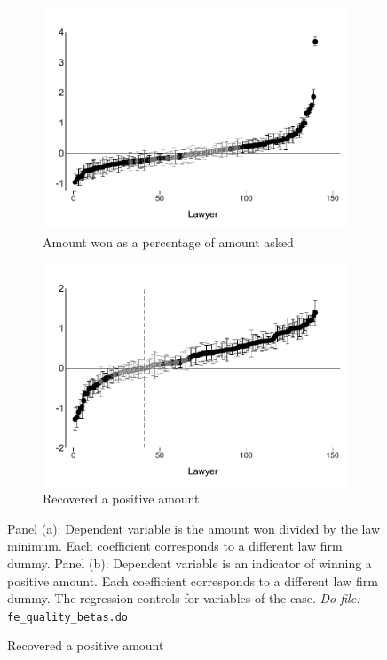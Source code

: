 \documentclass[oneside,12pt]{article}
\begin{document}
\begin{figure}[!htbp] %
    \caption{Lawyer fixed effects, controlling for variables of the case}
     \begin{center}
    \begin{subfigure}{0.49\textwidth}
        \caption{Amount won as a percentage of amount asked}
        \centering
        \includegraphics[width=\textwidth]{Figuras/betas_ql_win_minley.pdf}
    \end{subfigure}
    \begin{subfigure}{0.49\textwidth}
        \caption{Recovered a positive amount}
        \centering
        \includegraphics[width=\textwidth]{Figuras/betas_ql_pos_rec.pdf}
    \end{subfigure}
    \end{center}
    \scriptsize{ \noindent Panel (a): Dependent variable is the amount won divided by the law minimum. Each coefficient corresponds to a different law firm dummy. Panel (b): Dependent variable is an indicator of winning a positive amount. Each coefficient corresponds to a different law firm dummy. The regression controls for variables of the case.
    \textit{Do file: }  \texttt{fe\_quality\_betas.do}}
    \label{fig:1}
\end{figure}
\end{document}
